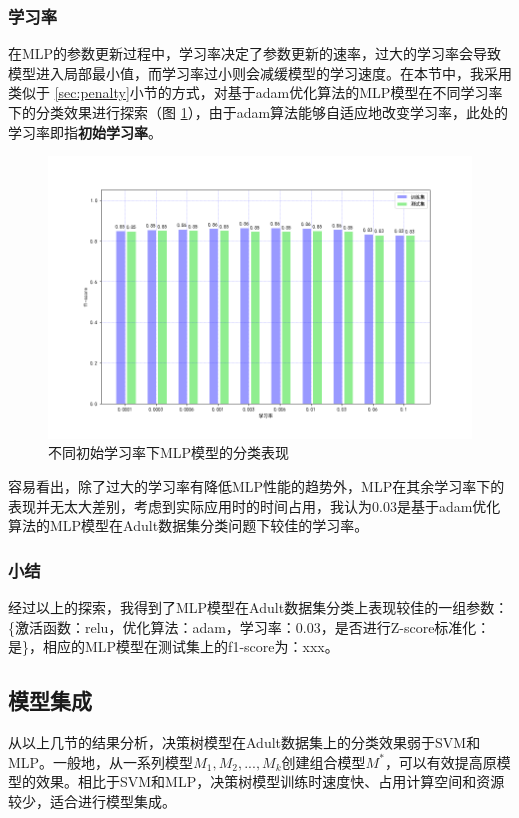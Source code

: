 \documentclass[12pt,a4paper]{article}
\theoremstyle{definition}
\begin{document}
\subsubsection{学习率}

在MLP的参数更新过程中，学习率决定了参数更新的速率，过大的学习率会导致模型进入局部最小值，而学习率过小则会减缓模型的学习速度。在本节中，我采用类似于 \ref{sec:penalty}小节的方式，对基于adam优化算法的MLP模型在不同学习率下的分类效果进行探索（图 \ref{fig:lr}），由于adam算法能够自适应地改变学习率，此处的学习率即指\textbf{初始学习率}。

\begin{figure}[H]
	\centering
	\includegraphics[width=0.75\linewidth]{img/mlp_lr.png}
	\caption{不同初始学习率下MLP模型的分类表现}
	\label{fig:lr}
\end{figure}

容易看出，除了过大的学习率有降低MLP性能的趋势外，MLP在其余学习率下的表现并无太大差别，考虑到实际应用时的时间占用，我认为0.03是基于adam优化算法的MLP模型在Adult数据集分类问题下较佳的学习率。

\subsubsection{小结}

经过以上的探索，我得到了MLP模型在Adult数据集分类上表现较佳的一组参数：\{激活函数：relu，优化算法：adam，学习率：0.03，是否进行Z-score标准化：是\}，相应的MLP模型在测试集上的f1-score为：xxx。

\subsection{模型集成}

从以上几节的结果分析，决策树模型在Adult数据集上的分类效果弱于SVM和MLP。一般地，从一系列模型$M_1, M_2, ... , M_k$创建组合模型$M^*$，可以有效提高原模型的效果。相比于SVM和MLP，决策树模型训练时速度快、占用计算空间和资源较少，适合进行模型集成。
\end{document}
